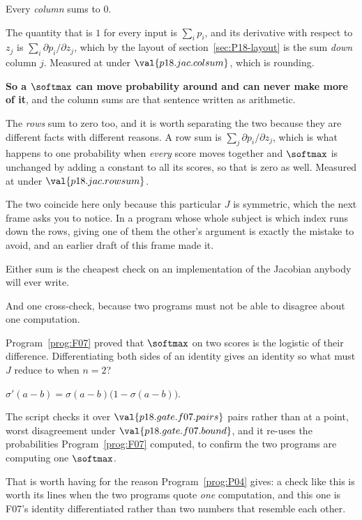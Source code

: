 \begin{fr}
\begin{ansblock}
Every \emph{column} sums to $0$.
\end{ansblock}

The quantity that is $1$ for every input is $\sum_i p_i$, and its derivative
with respect to $z_j$ is $\sum_i \partial p_i/\partial z_j$, which by the
layout of section~\ref{sec:P18-layout} is the sum \emph{down} column $j$.
Measured at under $\val{p18.jac.colsum}$, which is rounding.

\textbf{So a $\softmax$ can move probability around and can never make more of
it}, and the column sums are that sentence written as arithmetic.

\begin{note}
The \emph{rows} sum to zero too, and it is worth separating the two because
they are different facts with different reasons. A row sum is
$\sum_j \partial p_i/\partial z_j$, which is what happens to one probability
when \emph{every} score moves together \dash{} and $\softmax$ is unchanged by
adding a constant to all its scores, so that is zero as well. Measured at
under $\val{p18.jac.rowsum}$.

The two coincide here only because this particular $J$ is symmetric, which the
next frame asks you to notice. In a program whose whole subject is which index
runs down the rows, giving one of them the other's argument is exactly the
mistake to avoid, and an earlier draft of this frame made it.
\end{note}

Either sum is the cheapest check on an implementation of the Jacobian anybody
will ever write.
\end{fr}

\begin{fr}
And one cross-check, because two programs must not be able to disagree about
one computation.

Program~\ref{prog:F07} proved that $\softmax$ on two scores is the logistic
of their difference. Differentiating both sides of an identity gives an
identity \dash{} so what must $J$ reduce to when $n = 2$?
\nextframe
\end{fr}

\begin{fr}
\begin{ansblock}
$\sigma'(a - b) = \sigma(a-b)\bigl(1 - \sigma(a-b)\bigr)$.
\end{ansblock}

The script checks it over $\val{p18.gate.f07.pairs}$ pairs rather than at a
point, worst disagreement under $\val{p18.gate.f07.bound}$, and it re-uses the
probabilities Program~\ref{prog:F07} computed, to confirm the two programs
are computing one $\softmax$.

That is worth having for the reason Program~\ref{prog:P04} gives: a check
like this is worth its lines when the two programs quote \emph{one}
computation, and this one is F07's identity differentiated rather than two
numbers that resemble each other.
\end{fr}

